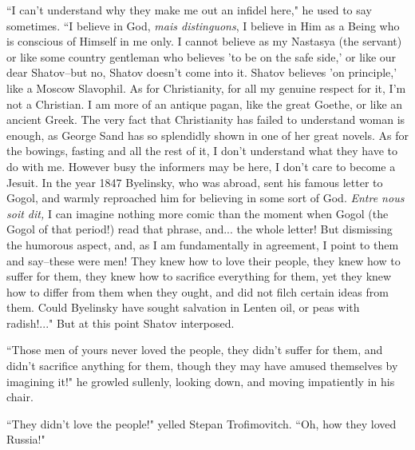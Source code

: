\documentclass[12pt]{article}
\begin{document}
\vspace{12pt}
``I can't understand why they make me out an infidel here," he used to
say sometimes. ``I believe in God, \emph{mais distinguons}, I believe in Him as
a Being who is conscious of Himself in me only. I cannot believe as my
Nastasya (the servant) or like some country gentleman who believes 'to
be on the safe side,' or like our dear Shatov--but no, Shatov doesn't
come into it. Shatov believes 'on principle,' like a Moscow Slavophil.
As for Christianity, for all my genuine respect for it, I'm not a
Christian. I am more of an antique pagan, like the great Goethe, or
like an ancient Greek. The very fact that Christianity has failed to
understand woman is enough, as George Sand has so splendidly shown in
one of her great novels. As for the bowings, fasting and all the rest
of it, I don't understand what they have to do with me. However busy the
informers may be here, I don't care to become a Jesuit. In the year 1847
Byelinsky, who was abroad, sent his famous letter to Gogol, and warmly
reproached him for believing in some sort of God. \emph{Entre nous soit dit,} I
can imagine nothing more comic than the moment when Gogol (the Gogol of
that period!) read that phrase, and... the whole letter! But dismissing
the humorous aspect, and, as I am fundamentally in agreement, I point to
them and say--these were men! They knew how to love their people, they
knew how to suffer for them, they knew how to sacrifice everything for
them, yet they knew how to differ from them when they ought, and did not
filch certain ideas from them. Could Byelinsky have sought salvation
in Lenten oil, or peas with radish!..." But at this point Shatov
interposed.


\vspace{12pt}
``Those men of yours never loved the people, they didn't suffer for them,
and didn't sacrifice anything for them, though they may have amused
themselves by imagining it!" he growled sullenly, looking down, and
moving impatiently in his chair.


\vspace{12pt}
``They didn't love the people!" yelled Stepan Trofimovitch. ``Oh, how they
loved Russia!"
\end{document}
